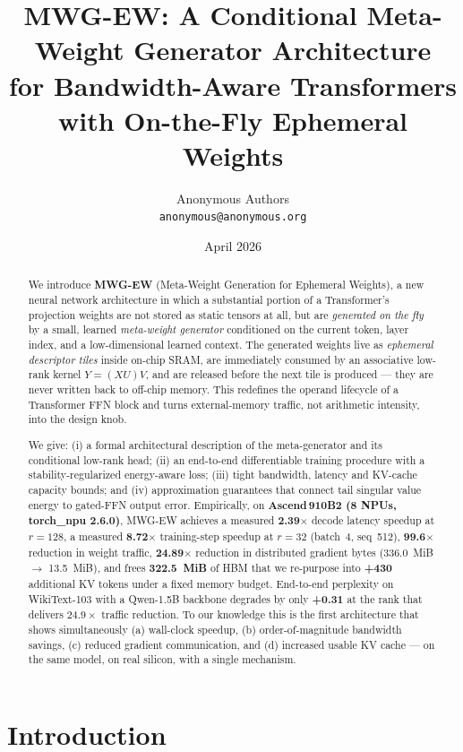 \documentclass[11pt]{article}
\title{\textbf{MWG-EW: A Conditional Meta-Weight Generator Architecture\\
for Bandwidth-Aware Transformers with On-the-Fly Ephemeral Weights}}
\author{
  Anonymous Authors \\
  \texttt{anonymous@anonymous.org}
}
\date{April 2026}
\theoremstyle{definition}
\begin{document}
\maketitle

\begin{abstract}
We introduce \textbf{MWG-EW} (Meta-Weight Generation for Ephemeral Weights), a new neural network architecture in which a substantial portion of a Transformer's projection weights are not stored as static tensors at all, but are \emph{generated on the fly} by a small, learned \emph{meta-weight generator} conditioned on the current token, layer index, and a low-dimensional learned context. The generated weights live as \emph{ephemeral descriptor tiles} inside on-chip SRAM, are immediately consumed by an associative low-rank kernel $Y=(XU)V$, and are released before the next tile is produced --- they are never written back to off-chip memory. This redefines the operand lifecycle of a Transformer FFN block and turns external-memory traffic, not arithmetic intensity, into the design knob.

We give: (i) a formal architectural description of the meta-generator and its conditional low-rank head; (ii) an end-to-end differentiable training procedure with a stability-regularized energy-aware loss; (iii) tight bandwidth, latency and KV-cache capacity bounds; and (iv) approximation guarantees that connect tail singular value energy to gated-FFN output error. Empirically, on \textbf{Ascend\,910B2 (8 NPUs, torch\_npu 2.6.0)}, MWG-EW achieves a measured \textbf{2.39$\times$} decode latency speedup at $r{=}128$, a measured \textbf{8.72$\times$} training-step speedup at $r{=}32$ (batch~4, seq~512), \textbf{99.6$\times$} reduction in weight traffic, \textbf{24.89$\times$} reduction in distributed gradient bytes (336.0~MiB $\to$ 13.5~MiB), and frees \textbf{322.5~MiB} of HBM that we re-purpose into \textbf{+430} additional KV tokens under a fixed memory budget. End-to-end perplexity on WikiText-103 with a Qwen-1.5B backbone degrades by only \textbf{+0.31} at the rank that delivers $24.9\times$ traffic reduction. To our knowledge this is the first architecture that shows simultaneously (a) wall-clock speedup, (b) order-of-magnitude bandwidth savings, (c) reduced gradient communication, and (d) increased usable KV cache --- on the same model, on real silicon, with a single mechanism.
\end{abstract}

\section{Introduction}
\label{sec:intro}
\end{document}
